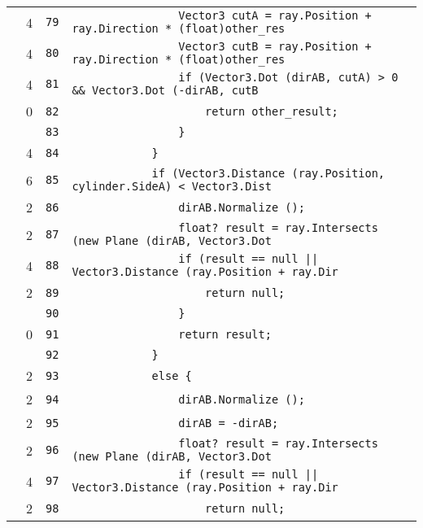 \documentclass[a4paper,10pt]{article}
\begin{document}
\begin{longtable}[l]{lrrl}
\cellcolor{green} & 4 & \verb~79~ & \verb~                Vector3 cutA = ray.Position + ray.Direction * (float)other_res~\\
\cellcolor{green} & 4 & \verb~80~ & \verb~                Vector3 cutB = ray.Position + ray.Direction * (float)other_res~\\
\cellcolor{green} & 4 & \verb~81~ & \verb~                if (Vector3.Dot (dirAB, cutA) > 0 && Vector3.Dot (-dirAB, cutB~\\
\cellcolor{red} & 0 & \verb~82~ & \verb~                    return other_result;~\\
\cellcolor{gray} &  & \verb~83~ & \verb~                }~\\
\cellcolor{green} & 4 & \verb~84~ & \verb~            }~\\
\cellcolor{green} & 6 & \verb~85~ & \verb~            if (Vector3.Distance (ray.Position, cylinder.SideA) < Vector3.Dist~\\
\cellcolor{green} & 2 & \verb~86~ & \verb~                dirAB.Normalize ();~\\
\cellcolor{green} & 2 & \verb~87~ & \verb~                float? result = ray.Intersects (new Plane (dirAB, Vector3.Dot ~\\
\cellcolor{green} & 4 & \verb~88~ & \verb~                if (result == null || Vector3.Distance (ray.Position + ray.Dir~\\
\cellcolor{green} & 2 & \verb~89~ & \verb~                    return null;~\\
\cellcolor{gray} &  & \verb~90~ & \verb~                }~\\
\cellcolor{red} & 0 & \verb~91~ & \verb~                return result;~\\
\cellcolor{gray} &  & \verb~92~ & \verb~            }~\\
\cellcolor{green} & 2 & \verb~93~ & \verb~            else {~\\
\cellcolor{green} & 2 & \verb~94~ & \verb~                dirAB.Normalize ();~\\
\cellcolor{green} & 2 & \verb~95~ & \verb~                dirAB = -dirAB;~\\
\cellcolor{green} & 2 & \verb~96~ & \verb~                float? result = ray.Intersects (new Plane (dirAB, Vector3.Dot ~\\
\cellcolor{green} & 4 & \verb~97~ & \verb~                if (result == null || Vector3.Distance (ray.Position + ray.Dir~\\
\cellcolor{green} & 2 & \verb~98~ & \verb~                    return null;~\\

\end{longtable}
\end{document}
